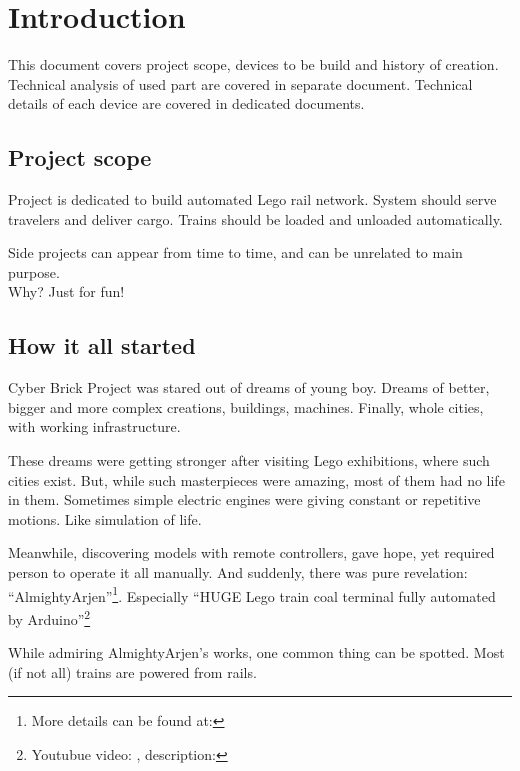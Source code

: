 \section{Introduction}

This document covers project scope, devices to be build and history of creation. Technical analysis
of used part are covered in separate document. Technical details of each device are covered in
dedicated documents.

\subsection{Project scope}

Project is dedicated to build automated Lego rail network. System should serve travelers and
deliver cargo. Trains should be loaded and unloaded automatically.

Side projects can appear from time to time, and can be unrelated to main purpose.\\
Why? Just for fun!


\subsection{How it all started}

Cyber Brick Project was stared out of dreams of young boy. Dreams of better, bigger and more
complex creations, buildings, machines. Finally, whole cities, with working infrastructure.

These dreams were getting stronger after visiting Lego exhibitions, where such cities exist. But,
while such masterpieces were amazing, most of them had no life in them. Sometimes simple electric
engines were giving constant or repetitive motions. Like simulation of life.

Meanwhile, discovering models with remote controllers, gave hope, yet required person to
operate it all manually. And suddenly, there was pure revelation: ``AlmightyArjen''\footnote{
More details can be found at: }. Especially ``HUGE Lego train
coal terminal fully automated by Arduino''\footnote{ Youtubue video:
, description: }

While admiring AlmightyArjen's works, one common thing can be spotted. Most (if not all) trains
are powered from rails.


